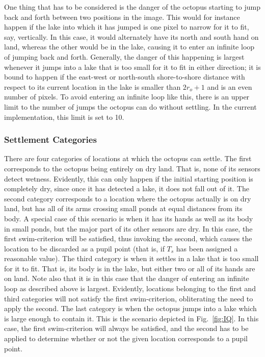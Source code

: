 One thing that has to be considered is the danger of the octopus
starting to jump back and forth between two positions in the image.
This would for instance happen if the lake into which it has jumped is
one pixel to narrow for it to fit, say, vertically.  In this case, it
would alternately have its north and south hand on land, whereas the
other would be in the lake, causing it to enter an infinite loop of
jumping back and forth.  Generally, the danger of this happening is
largest whenever it jumps into a lake that is too small for it to fit
in either direction; it is bound to happen if the east-west or
north-south shore-to-shore distance with respect to its current
location in the lake is smaller than $2r_{o}+1$ and is an even number
of pixels.  To avoid {\octopus} entering an infinite loop like this,
there is an upper limit to the number of jumps the octopus can do
without settling.  In the current implementation, this limit is set to
10.

\subsubsection{Settlement Categories}

There are four categories of locations at which the octopus can
settle.  The first corresponds to the octopus being entirely on dry
land.  That is, none of its sensors detect wetness.  Evidently, this
can only happen if the initial starting position is completely dry,
since once it has detected a lake, it does not fall out of it.  The
second category corresponds to a location where the octopus actually
is on dry land, but has all of its arms crossing small ponds at equal
distances from its body.  A special case of this scenario is when it
has its hands as well as its body in small ponds, but the major part
of its other sensors are dry.  In this case, the first swim-criterion
will be satisfied, thus invoking the second, which causes the location
to be discarded as a pupil point (that is, if $T_{s}$ has been
assigned a reasonable value).  The third category is when it settles
in a lake that is too small for it to fit.  That is, its body is in
the lake, but either two or all of its hands are on land.  Note also
that it is in this case that the danger of entering an infinite loop
as described above is largest.  Evidently, locations belonging to the
first and third categories will not satisfy the first swim-criterion,
obliterating the need to apply the second.  The last category is when
the octopus jumps into a lake which is large enough to contain it.
This is the scenario depicted in Fig.~\ref{fig:IQ}.  In this case, the
first swim-criterion will always be satisfied, and the second has to
be applied to determine whether or not the given location corresponds
to a pupil point.

